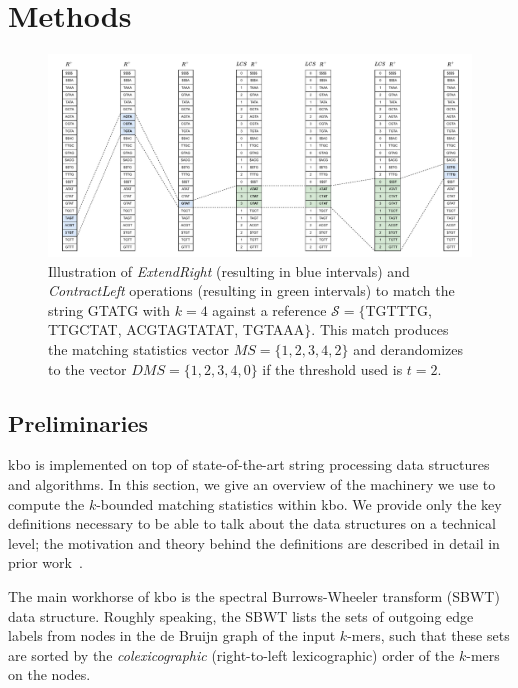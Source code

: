 \documentclass[unnumsec,webpdf,contemporary,large]{oup-authoring-template}%
\theoremstyle{thmstyleone}%
\theoremstyle{thmstyletwo}%
\theoremstyle{thmstylethree}%
\begin{document}
\section{Methods}\label{methods}

\begin{figure}[b]
    \centering
    \includegraphics[scale=0.6]{fig/SBWT_search_LCS.drawio.pdf}
    \caption{Illustration of {\em ExtendRight} (resulting in blue intervals) and {\em ContractLeft} operations (resulting in green intervals) to match the string {\sf GTATG} with $k=4$ against a reference $\mathcal{S}= \{${\sf TGTTTG}, {\sf TTGCTAT}, {\sf ACGTAGTATAT}, {\sf TGTAAA}$\}$. This match produces the matching statistics vector $MS=\{ 1, 2, 3, 4, 2 \}$ and derandomizes to the vector $DMS=\{ 1, 2, 3, 4, 0 \}$ if the threshold used is $t = 2$. }
    \label{fig:sbwt-search}
\end{figure}

\subsection{Preliminaries}\label{preliminaries}

{\sf kbo} is implemented on top of state-of-the-art string processing data structures and algorithms. In this section, we give an overview of the machinery we use to compute the $k$-bounded matching statistics within {\sf kbo}. We provide only the key definitions necessary to be able to talk about the data structures on a technical level; the motivation and theory behind the definitions are described in detail in prior work~\cite{alanko2023longest, alanko2024finimizers, alanko2023small}.




The main workhorse of {\sf kbo} is the spectral Burrows-Wheeler transform (SBWT) data structure. Roughly speaking, the SBWT lists the sets of outgoing edge labels from nodes in the de Bruijn graph of the input $k$-mers, such that these sets are sorted by the \emph{colexicographic} (right-to-left lexicographic) order of the $k$-mers on the nodes.
\end{document}

